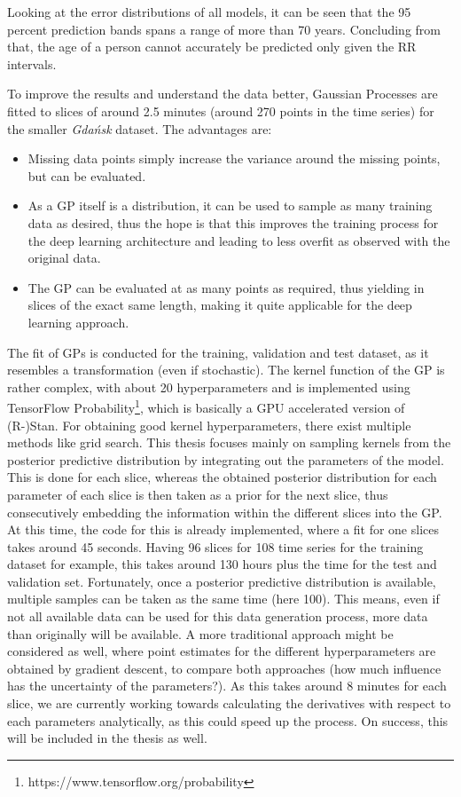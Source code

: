 \documentclass[11pt]{scrartcl}
\begin{document}
Looking at the error distributions of all models, it can be seen that the 95 percent prediction bands spans a range of more than 70 years. Concluding from that, the age of a person cannot accurately be predicted only given the RR intervals.

To improve the results and understand the data better, Gaussian Processes are fitted to slices of around 2.5 minutes (around 270 points in the time series) for the smaller \textit{Gdańsk} dataset. The advantages are:

\begin{itemize}
    \item Missing data points simply increase the variance around the missing points, but can be evaluated.
    \item As a GP itself is a distribution, it can be used to sample as many training data as desired, thus the hope is that this improves the training process for the deep learning architecture and leading to less overfit as observed with the original data.
    \item The GP can be evaluated at as many points as required, thus yielding in slices of the exact same length, making it quite applicable for the deep learning approach.
\end{itemize}

The fit of GPs is conducted for the training, validation and test dataset, as it resembles a transformation (even if stochastic). The kernel function of the GP is rather complex, with about 20 hyperparameters and is implemented using TensorFlow Probability\footnote{https://www.tensorflow.org/probability}, which is basically a GPU accelerated version of (R-)Stan. For obtaining good kernel hyperparameters, there exist multiple methods like grid search. This thesis focuses mainly on sampling kernels from the posterior predictive distribution by integrating out the parameters of the model. This is done for each slice, whereas the obtained posterior distribution for each parameter of each slice is then taken as a prior for the next slice, thus consecutively embedding the information within the different slices into the GP. At this time, the code for this is already implemented, where a fit for one slices takes around 45 seconds. Having 96 slices for 108 time series for the training dataset for example, this takes around 130 hours plus the time for the test and validation set. Fortunately, once a posterior predictive distribution is available, multiple samples can be taken as the same time (here 100). This means, even if not all available data can be used for this data generation process, more data than originally will be available. A more traditional approach might be considered as well, where point estimates for the different hyperparameters are obtained by gradient descent, to compare both approaches (how much influence has the uncertainty of the parameters?). As this takes around 8 minutes for each slice, we are currently working towards calculating the derivatives with respect to each parameters analytically, as this could speed up the process. On success, this will be included in the thesis as well.
\end{document}

